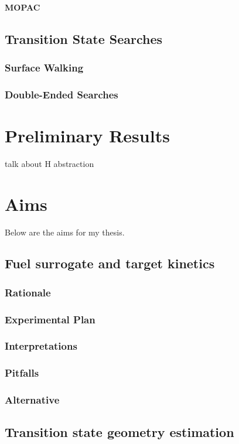 \documentclass[12pt]{article}
\begin{document}
\paragraph{MOPAC}

\subsection{Transition State Searches}
\subsubsection{Surface Walking}
\subsubsection{Double-Ended Searches}
\section{Preliminary Results}
talk about H abstraction
\section{Aims}

Below are the aims for my thesis.

\subsection{Fuel surrogate and target kinetics}
\subsubsection{Rationale}
\subsubsection{Experimental Plan}
\subsubsection{Interpretations}
\subsubsection{Pitfalls}
\subsubsection{Alternative}

\subsection{Transition state geometry estimation}
\end{document}
